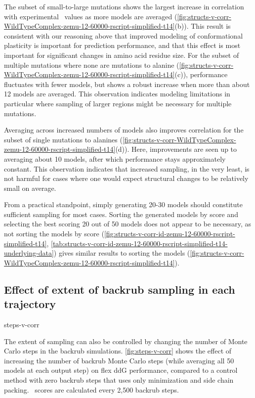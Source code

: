The subset of small-to-large mutations shows the largest increase in correlation with experimental \ddg\ values as more models are averaged (\cref{fig:structs-v-corr-WildTypeComplex-zemu-12-60000-rscript-simplified-t14}(b)). This result is consistent with our reasoning above that improved modeling of conformational plasticity is important for prediction performance, and that this effect is most important for significant changes in amino acid residue size. For the subset of multiple mutations where none are mutations to alanine (\cref{fig:structs-v-corr-WildTypeComplex-zemu-12-60000-rscript-simplified-t14}(c)), performance fluctuates with fewer models, but shows a robust increase when more than about 12 models are averaged. This observation indicates modeling limitations in particular where sampling of larger regions might be necessary for multiple mutations.

Averaging across increased numbers of models also improves correlation for the subset of single mutations to alanines (\cref{fig:structs-v-corr-WildTypeComplex-zemu-12-60000-rscript-simplified-t14}(d)).
Here, improvements are seen up to averaging about 10 models, after which performance stays approximately constant.
This observation indicates that increased sampling, in the very least, is not harmful for cases where one would expect structural changes to be relatively small on average.

From a practical standpoint, simply generating 20-30 models should constitute sufficient sampling for most cases. Sorting the generated models by score and selecting the best scoring 20 out of 50 models does not appear to be necessary, as not sorting the models by score (\cref{fig:structs-v-corr-id-zemu-12-60000-rscript-simplified-t14}, \cref{tab:structs-v-corr-id-zemu-12-60000-rscript-simplified-t14-underlying-data}) gives similar results to sorting the models (\cref{fig:structs-v-corr-WildTypeComplex-zemu-12-60000-rscript-simplified-t14}).

\subsection{Effect of extent of backrub sampling in each trajectory}

{steps-v-corr}

The extent of sampling can also be controlled by changing the number of Monte Carlo steps in the backrub simulations.
\cref{fig:steps-v-corr} shows the effect of increasing the number of backrub Monte Carlo steps (while averaging all 50 models at each output step) on flex ddG performance, compared to a control method with zero backrub steps that uses only minimization and side chain packing.
\ddg\ scores are calculated every 2,500 backrub steps.

